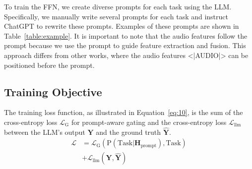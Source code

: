 To train the FFN, we create diverse prompts for each task using the LLM. Specifically, we manually write several prompts for each task and instruct ChatGPT to rewrite these prompts. Examples of these prompts are shown in Table~\ref{table:example}. It is important to note that the audio features follow the prompt because we use the prompt to guide feature extraction and fusion. This approach differs from other works, where the audio features <|AUDIO|> can be positioned before the prompt.

\begin{table}[t]
    \centering
    \small
    \caption{Examples of prompts for different tasks.}
    \label{table:example}
\end{table}

\subsection{Training Objective}

The training loss function, as illustrated in Equation~\ref{eq:10}, is the sum of the cross-entropy loss $\mathcal{L}_\text{G}$ for prompt-aware gating and the cross-entropy loss $\mathcal{L}_\text{llm}$ between the LLM's output $\mathbf{Y}$ and the ground truth $\hat{\mathbf{Y}}$.
 \begin{align}
 \label{eq:10}
 \mathcal{L} &= \mathcal{L}_\text{G}(\text{P}(\text{Task}|\mathbf{H}_\text{prompt}), \text{Task}) \nonumber \\ 
 &+ \mathcal{L}_\text{llm}(\mathbf{Y}, \hat{\mathbf{Y}}) 
\end{align}

